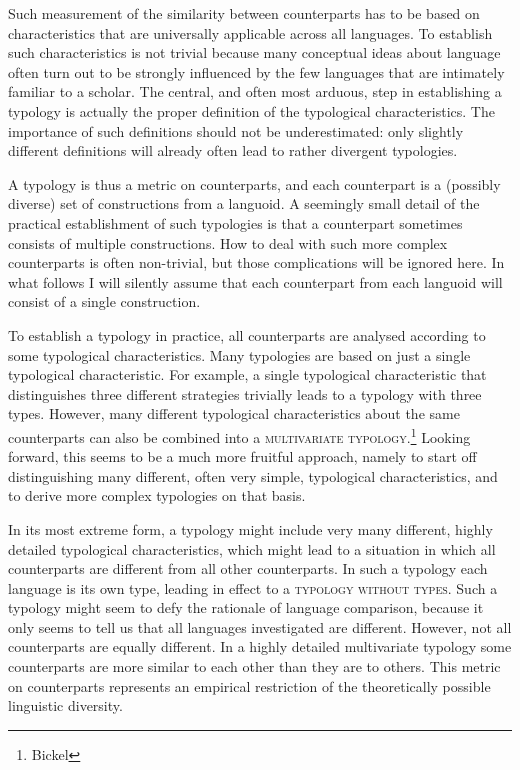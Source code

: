 Such measurement of the similarity between counterparts has to be based on characteristics that are universally applicable across all languages. To establish such characteristics is not trivial because many conceptual ideas about language often turn out to be strongly influenced by the few languages that are intimately familiar to a scholar. The central, and often most arduous, step in establishing a typology is actually the proper definition of the typological characteristics. The importance of such definitions should not be underestimated: only slightly different definitions will already often lead to rather divergent typologies.

A typology is thus a metric on counterparts, and each counterpart is a (possibly diverse) set of constructions from a languoid. A seemingly small detail of the practical establishment of such typologies is that a counterpart sometimes consists of multiple constructions. How to deal with such more complex counterparts is often non-trivial, but those complications will be ignored here. In what follows I will silently assume that each counterpart from each languoid will consist of a single construction.

%
To establish a typology in practice, all counterparts are analysed according to some  typological characteristics. Many typologies are based on just a single typological characteristic. For example, a single typological characteristic that distinguishes three different strategies trivially leads to a typology with three types. However, many different typological characteristics about the same counterparts can also be combined into a \textsc{multivariate typology}.\footnote{Bickel} Looking forward, this seems to be a much more fruitful approach, namely to start off distinguishing many different, often very simple, typological characteristics, and to derive more complex typologies on that basis.

In its most extreme form, a typology might include very many different, highly detailed typological characteristics, which might lead to a situation in which all counterparts are different from all other counterparts. In such a typology each language is its own type, leading in effect to a \textsc{typology without types}. Such a typology might seem to defy the rationale of language comparison, because it only seems to tell us that all languages investigated are different. However, not all counterparts are equally different. In a highly detailed multivariate typology some counterparts are more similar to each other than they are to others. This metric on counterparts represents an empirical restriction of the theoretically possible linguistic diversity.

